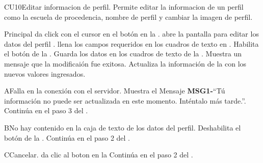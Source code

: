 
	\begin{UseCase}{CU10}{Editar informacion de perfil.}{
		Permite editar la informacion de un perfil como la escuela de procedencia, nombre de perfil y cambiar la imagen de perfil.
	}
		
	\end{UseCase}

	\begin{UCtrayectoria}{Principal}
		\UCpaso[\UCactor] da click con el cursor en el botón  en la .
		\UCpaso abre la pantalla para editar los datos del perfil .
		\UCpaso[\UCactor] llena los campos requeridos en los cuadros de texto en .
		\UCpaso Habilita el botón  de la .
		\UCpaso Guarda los datos en los cuadros de texto de la   .
		\UCpaso Muestra un mensaje que la modificaión fue exitosa.
		\UCpaso Actualiza la información de la  con los nuevos valores ingresados.
		
	\end{UCtrayectoria}
		\begin{UCtrayectoriaA}{A}{Falla en la conexión con el servidor.}
			\UCpaso Muestra el Mensaje {\bf MSG1-}``Tú información no puede ser actualizada en este momento. Inténtalo más tarde.''.
			\UCpaso Continúa en el paso 3 del .
		\end{UCtrayectoriaA}

		\begin{UCtrayectoriaA}{B}{No hay contenido en la caja de texto de los datos del perfil.}
			\UCpaso Deshabilita el botón  de la .
			\UCpaso Continúa en el paso 2 del .
		\end{UCtrayectoriaA}

		
		\begin{UCtrayectoriaA}{C}{Cancelar.}
			\UCpaso[\UCactor]da clic al boton  en la 
			\UCpaso Continúa en el paso 2 del .
		\end{UCtrayectoriaA}
		
